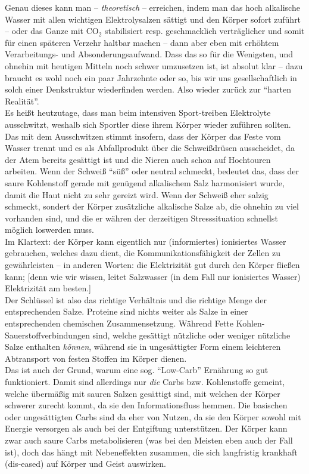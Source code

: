 \documentclass[a5paper,8pt]{scrbook}
\begin{document}
Genau dieses kann man -- \emph{theoretisch} -- erreichen, indem man das hoch alkalische Wasser mit allen wichtigen Elektrolysalzen sättigt und den Körper sofort zuführt -- oder das Ganze mit CO$_2$ stabilisiert resp. geschmacklich verträglicher und somit für einen späteren Verzehr haltbar machen -- dann aber eben mit erhöhtem Verarbeitungs- und Absonderungsaufwand. Dass das so für die Wenigsten, und ohnehin mit heutigen Mitteln noch schwer umzusetzen ist, ist absolut klar -- dazu braucht es wohl noch ein paar Jahrzehnte oder so, bis wir uns gesellschaftlich in solch einer Denkstruktur wiederfinden werden. Also wieder zurück zur ``harten Realität''.\\

Es heißt heutzutage, dass man beim intensiven Sport-treiben Elektrolyte ausschwitzt, weshalb sich Sportler diese ihrem Körper wieder zuführen sollten. Das mit dem Ausschwitzen stimmt insofern, dass der Körper das Feste vom Wasser trennt und es als Abfallprodukt über die Schweißdrüsen ausscheidet, da der Atem bereits gesättigt ist und die Nieren auch schon auf Hochtouren arbeiten. Wenn der Schweiß ``süß'' oder neutral schmeckt, bedeutet das, dass der saure Kohlenstoff gerade mit genügend alkalischem Salz harmonisiert wurde, damit die Haut nicht zu sehr gereizt wird. Wenn der Schweiß eher salzig schmeckt, sondert der Körper zusätzliche alkalische Salze ab, die ohnehin zu viel vorhanden sind, und die er währen der derzeitigen Stresssituation schnellst möglich loswerden muss.\\

Im Klartext: der Körper kann eigentlich nur (informiertes) ionisiertes Wasser gebrauchen, welches dazu dient, die Kommunikationsfähigkeit der Zellen zu gewährleisten -- in anderen Worten: die Elektrizität gut durch den Körper fließen kann; [denn wie wir wissen, leitet Salzwasser (in dem Fall nur ionisiertes Wasser) Elektrizität am besten.] \\

Der Schlüssel ist also das richtige Verhältnis und die richtige Menge der entsprechenden Salze. Proteine sind nichts weiter als Salze in einer entsprechenden chemischen Zusammensetzung. Während Fette Kohlen-Sauerstoffverbindungen sind, welche gesättigt nützliche oder weniger nützliche Salze enthalten \emph{können}, während sie in ungesättigter Form einem leichteren Abtransport von festen Stoffen im Körper dienen.\\

Das ist auch der Grund, warum eine sog. ``Low-Carb'' Ernährung so gut funktioniert. Damit sind allerdings nur \emph{die} Carbs bzw. Kohlenstoffe gemeint, welche übermäßig mit sauren Salzen gesättigt sind, mit welchen der Körper schwerer zurecht kommt, da sie den Informationsfluss hemmen. Die basischen oder ungesättigten Carbs sind da eher von Nutzen, da sie den Körper sowohl mit Energie versorgen als auch bei der Entgiftung unterstützen. Der Körper kann zwar auch saure Carbs metabolisieren (was bei den Meisten eben auch der Fall ist), doch das hängt mit Nebeneffekten zusammen, die sich langfristig krankhaft (dis-eased) auf Körper und Geist auswirken.
\end{document}

